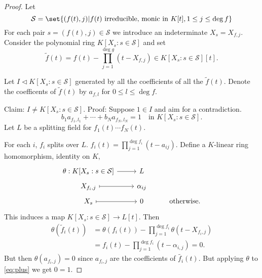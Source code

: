 \documentclass{article}
\begin{document}
\begin{proof}
    Let
    \begin{equation*}
        \mathcal{S} = \set{(f(t),j) | f(t) \text{ irreducible, monic in } K[t], 1 \leq j \leq \deg f}
    \end{equation*}
    For each pair $s = (f(t),j) \in \mathcal{S}$ we introduce an indeterminate $X_s = X_{f,j}$.
    Consider the polynomial ring $K[X_s: s \in \mathcal{S}]$ and set
    \begin{equation*}\tilde{f}(t) = f(t) - \prod_{j=1}^{\deg g} (t - X_{f,j}) \in K[X_s: s \in \mathcal{S}][t].\end{equation*}

    Let $I \lhd K[X_s : s \in \mathcal{S}]$ generated by all the coefficients of all the $\tilde{f}(t)$.
    Denote the coefficents of $\tilde{f}(t)$ by $a_{f,l}$ for $0 \leq l \leq \deg f$.

    Claim: $I \neq K[X_s : s \in \mathcal{S}]$.
    Proof: Suppose $1 \in I$ and aim for a contradiction.
    \begin{equation*}
        b_1 a_{f_1,l_1} + \dotsb + b_N a_{f_N,l_N} = 1 \quad \text{in } K[X_s : s \in \mathcal{S}]. \tag{$+$} \label{eq:plus}
    \end{equation*}
    Let $L$ be a splitting field for $f_1(t) \dotsm f_N(t)$.

    For each $i$, $f_i$ splits over $L$. $f_i(t) = \prod_{j=1}^{\deg f_i} (t-a_{ij})$.
    Define a $K$-linear ring homomorphism, identity on $K$,
    \begin{equation*}
        \begin{tikzcd}[row sep=tiny]
            \theta: K[X_s : s \in \mathcal{S}] \rar & L \\
            X_{f_i,j} \rar[maps to] & \alpha_{ij} \\
            X_s \rar[maps to] & 0 & \text{otherwise}.
        \end{tikzcd}
    \end{equation*}
    This induces a map $K[X_s : s \in \mathcal{S}] \to L[t]$.
    Then
    \begin{align*}
        \theta(\tilde{f}_i(t)) &= \theta(f_i(t)) - \prod_{j=1}^{\deg f_i} \theta(t - X_{f_i,j}) \\
                               &= f_i(t) - \prod_{j=1}^{\deg f_i} (t - \alpha_{i,j}) = 0.
    \end{align*}
    But then $\theta(a_{f_i,j}) = 0$ since $a_{f_i,j}$ are the coefficients of $\tilde{f_i}(t)$.
    But applying $\theta$ to \eqref{eq:plus} we get $0=1$.


\end{proof}
\end{document}
